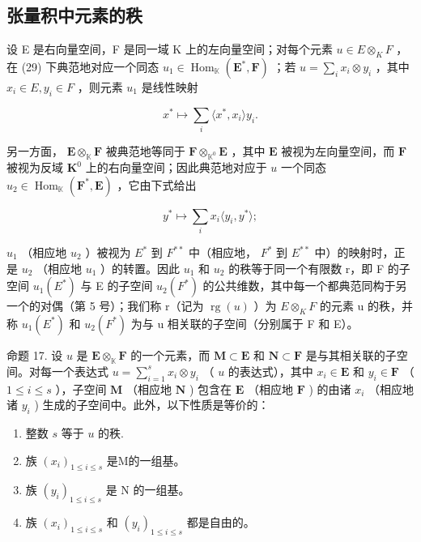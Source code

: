 \subsection{张量积中元素的秩}

设 E 是右向量空间，F 是同一域 K 上的左向量空间；对每个元素 \(u \in E \otimes_{K} F\) ，在 (29) 下典范地对应一个同态 \(u_{1} \in \operatorname{Hom}_{\mathbb{K}}(\mathbf{E}^{*}, \mathbf{F})\) ；若 \(u = \sum_{i} x_{i} \otimes y_{i}\) ，其中 \(x_{i} \in E, y_{i} \in F\) ，则元素 \(u_{1}\) 是线性映射

\[
x ^ {*} \mapsto \sum_ {i} \langle x ^ {*}, x _ {i} \rangle y _ {i}.\tag{33}
\]

另一方面， \(\mathbf{E} \otimes_{\mathbb{K}} \mathbf{F}\) 被典范地等同于 \(\mathbf{F} \otimes_{\mathbb{K}^0} \mathbf{E}\) ，其中 \(\mathbf{E}\) 被视为左向量空间，而 \(\mathbf{F}\) 被视为反域 \(\mathbf{K}^0\) 上的右向量空间；因此典范地对应于 \(u\) 一个同态 \(u_2 \in \operatorname{Hom}_{\mathbb{K}}(\mathbf{F}^*, \mathbf{E})\) ，它由下式给出

\[
y ^ {*} \mapsto \sum_ {i} x _ {i} \langle y _ {i}, y ^ {*} \rangle ;\tag{34}
\]

\(u_{1}\) （相应地 \(u_{2}\) ）被视为 \(E^{*}\) 到 \(F^{**}\) 中（相应地， \(F^{*}\) 到 \(E^{**}\) 中）的映射时，正是 \(u_{2}\) （相应地 \(u_{1}\) ）的转置。因此 \(u_{1}\) 和 \(u_{2}\) 的秩等于同一个有限数 r，即 F 的子空间 \(u_{1}(E^{*})\) 与 E 的子空间 \(u_{2}(F^{*})\) 的公共维数，其中每一个都典范同构于另一个的对偶（第 5 号）；我们称 r（记为 \(\operatorname{rg}(u)\) ）为 \(E \otimes_{K} F\) 的元素 u 的秩，并称 \(u_{1}(E^{*})\) 和 \(u_{2}(F^{*})\) 为与 u 相关联的子空间（分别属于 F 和 E）。

命题 17. 设 \(u\) 是 \(\mathbf{E} \otimes_{\mathbb{K}} \mathbf{F}\) 的一个元素，而 \(\mathbf{M} \subset \mathbf{E}\) 和 \(\mathbf{N} \subset \mathbf{F}\) 是与其相关联的子空间。对每一个表达式 \(u = \sum_{i=1}^{s} x_i \otimes y_i\) （ \(u\) 的表达式），其中 \(x_i \in \mathbf{E}\) 和 \(y_i \in \mathbf{F}\) （ \(1 \leqslant i \leqslant s\) ），子空间 \(\mathbf{M}\) （相应地 \(\mathbf{N}\) ) 包含在 \(\mathbf{E}\) （相应地 \(\mathbf{F}\) ) 的由诸 \(x_i\) （相应地诸 \(y_i\) ) 生成的子空间中。此外，以下性质是等价的：

\begin{enumerate}
\def\labelenumi{(\alph{enumi})}
\item
  整数 \(s\) 等于 \(u\) 的秩.
\item
  族 \((x_{i})_{1\leqslant i\leqslant s}\) 是M的一组基。
\item
  族 \((y_{i})_{1\leqslant i\leqslant s}\) 是 N 的一组基。
\item
  族 \((x_{i})_{1\leqslant i\leqslant s}\) 和 \((y_{i})_{1\leqslant i\leqslant s}\) 都是自由的。
\end{enumerate}

